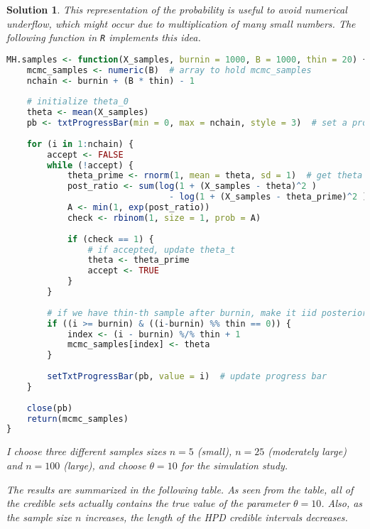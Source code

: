 \documentclass[12pt]{article}
\theoremstyle{problemstyle}
\newtheorem*{solution*}{Solution}
\begin{document}
\begin{solution*}
    This representation of the probability is useful to avoid numerical underflow, which might occur due to multiplication of many small numbers. The following function in \texttt{R} implements this idea.

    \begin{lstlisting}[language = R]
MH.samples <- function(X_samples, burnin = 1000, B = 1000, thin = 20) {
    mcmc_samples <- numeric(B)  # array to hold mcmc_samples
    nchain <- burnin + (B * thin) - 1
    
    # initialize theta_0
    theta <- mean(X_samples)
    pb <- txtProgressBar(min = 0, max = nchain, style = 3)  # set a progress bar
    
    for (i in 1:nchain) {
        accept <- FALSE
        while (!accept) {
            theta_prime <- rnorm(1, mean = theta, sd = 1)  # get theta'
            post_ratio <- sum(log(1 + (X_samples - theta)^2 ) 
                                - log(1 + (X_samples - theta_prime)^2 ))
            A <- min(1, exp(post_ratio))
            check <- rbinom(1, size = 1, prob = A) 
            
            if (check == 1) {
                # if accepted, update theta_t
                theta <- theta_prime
                accept <- TRUE
            }
        }
        
        # if we have thin-th sample after burnin, make it iid posterior sample
        if ((i >= burnin) & ((i-burnin) %% thin == 0)) {
            index <- (i - burnin) %/% thin + 1
            mcmc_samples[index] <- theta
        }
        
        setTxtProgressBar(pb, value = i)  # update progress bar
    }
    
    close(pb)
    return(mcmc_samples)
}                
    \end{lstlisting}

    I choose three different samples sizes $n = 5$ (small), $n = 25$ (moderately large) and $n = 100$ (large), and choose $\theta = 10$ for the simulation study. 

    The results are summarized in the following table. As seen from the table, all of the credible sets actually contains the true value of the parameter $\theta = 10$. Also, as the sample size $n$ increases, the length of the HPD credible intervals decreases.


\end{solution*}
\end{document}
